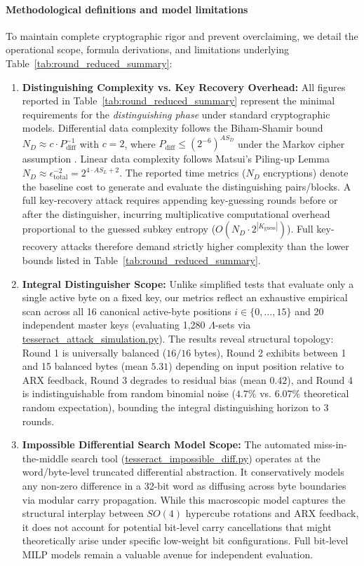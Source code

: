 \documentclass[10pt,twocolumn]{article}
\begin{document}
\paragraph{Methodological definitions and model limitations}
To maintain complete cryptographic rigor and prevent overclaiming, we detail the operational scope, formula derivations, and limitations underlying Table~\ref{tab:round_reduced_summary}:
\begin{enumerate}
    \item \textbf{Distinguishing Complexity vs. Key Recovery Overhead:} All figures reported in Table~\ref{tab:round_reduced_summary} represent the minimal requirements for the \emph{distinguishing phase} under standard cryptographic models. Differential data complexity follows the Biham-Shamir bound \cite{biham1991differential} $N_D \approx c \cdot P_{\text{diff}}^{-1}$ with $c=2$, where $P_{\text{diff}} \le (2^{-6})^{AS_D}$ under the Markov cipher assumption \cite{lai1991markov}. Linear data complexity follows Matsui's Piling-up Lemma \cite{matsui1993linear} $N_D \approx \epsilon_{\text{total}}^{-2} = 2^{4 \cdot AS_L + 2}$. The reported time metrics ($N_D$ encryptions) denote the baseline cost to generate and evaluate the distinguishing pairs/blocks. A full key-recovery attack requires appending key-guessing rounds before or after the distinguisher, incurring multiplicative computational overhead proportional to the guessed subkey entropy ($O(N_D \cdot 2^{|K_{\text{guess}}|})$). Full key-recovery attacks therefore demand strictly higher complexity than the lower bounds listed in Table~\ref{tab:round_reduced_summary}.
    \item \textbf{Integral Distinguisher Scope:} Unlike simplified tests that evaluate only a single active byte on a fixed key, our metrics reflect an exhaustive empirical scan across all 16 canonical active-byte positions $i \in \{0, \dots, 15\}$ and 20 independent master keys (evaluating 1,280 $\Lambda$-sets via \url{tesseract_attack_simulation.py}). The results reveal structural topology: Round 1 is universally balanced ($16/16$ bytes), Round 2 exhibits between 1 and 15 balanced bytes (mean $5.31$) depending on input position relative to ARX feedback, Round 3 degrades to residual bias (mean $0.42$), and Round 4 is indistinguishable from random binomial noise ($4.7\%$ vs. $6.07\%$ theoretical random expectation), bounding the integral distinguishing horizon to 3 rounds.
    \item \textbf{Impossible Differential Search Model Scope:} The automated miss-in-the-middle search tool (\url{tesseract_impossible_diff.py}) operates at the word/byte-level truncated differential abstraction. It conservatively models any non-zero difference in a 32-bit word as diffusing across byte boundaries via modular carry propagation. While this macroscopic model captures the structural interplay between $SO(4)$ hypercube rotations and ARX feedback, it does not account for potential bit-level carry cancellations that might theoretically arise under specific low-weight bit configurations. Full bit-level MILP models remain a valuable avenue for independent evaluation.
\end{enumerate}
\end{document}
